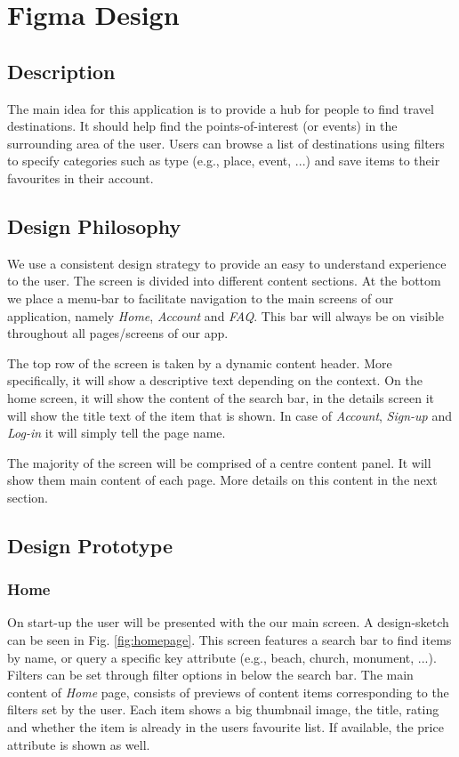 \chapter{Figma Design}

\section{Description}
The main idea for this application is to provide a hub for people to find travel destinations. It should help find the points-of-interest (or events) in the surrounding area of the user.
Users can browse a list of destinations using filters to specify categories such as type (e.g., place, event, ...) and save items to their favourites in their account. 


\section{Design Philosophy}

We use a consistent design strategy to provide an easy to understand experience to the user. The screen is divided into different content sections. At the bottom we place a menu-bar to facilitate navigation to the main screens of our application, namely \textsl{Home}, \textsl{Account} and \textsl{FAQ}. This bar will always be on visible throughout all pages/screens of our app.

The top row of the screen is taken by a dynamic content header. More specifically, it will show a descriptive text depending on the context. On the home screen, it will show the content of the search bar, in the details screen it will show the title text of the item that is shown. In case of \textsl{Account}, \textsl{Sign-up} and \textsl{Log-in} it will simply tell the page name.

The majority of the screen will be comprised of a centre content panel. It will show them main content of each page. More details on this content in the next section.

\section{Design Prototype}

\subsection*{Home}
On start-up the user will be presented with the our main screen. A design-sketch can be seen in Fig. \ref{fig:homepage}. This screen features a search bar to find items by name, or query a specific key attribute (e.g., beach, church, monument, ...). Filters can be set through filter options in below the search bar.
The main content of \textsl{Home} page, consists of previews of content items corresponding to the filters set by the user. Each item shows a big thumbnail image, the title, rating and whether the item is already in the users favourite list. If available, the price attribute is shown as well.

